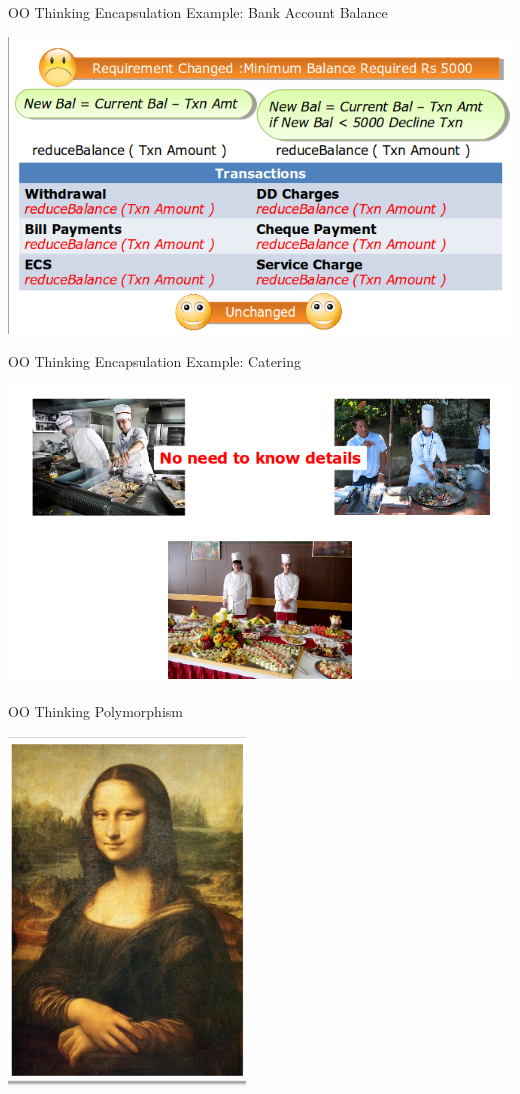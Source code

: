 \documentclass[14pt]{beamer}
\begin{document}
\begin{frame}{OO Thinking}
Encapsulation Example: Bank Account Balance
\begin{center}
    \includegraphics[scale=0.4]{Image28.png}
\end{center}
\end{frame}
\begin{frame}{OO Thinking}
Encapsulation Example: Catering
\begin{center}
    \includegraphics[scale=0.5]{Image25.png}
\end{center}
\end{frame}
\begin{frame}{OO Thinking}
Polymorphism
\begin{center}
    \includegraphics[scale=0.5]{Image26.png}
\end{center}
\end{frame}
\end{document}
